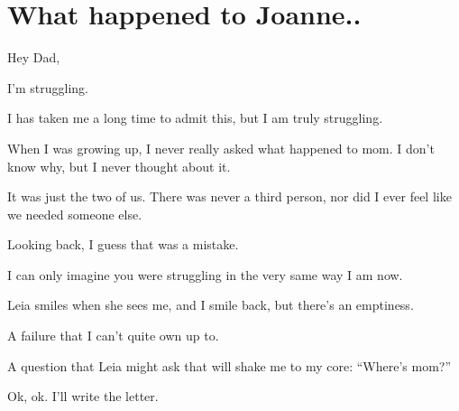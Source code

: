 \chapter{What happened to Joanne..}

\noindent Hey Dad,

I'm struggling.

I has taken me a long time to admit this, but I am truly struggling.

When I was growing up, I never really asked what happened to mom.
I don't know why, but I never thought about it.

It was just the two of us.
There was never a third person, nor did I ever feel like we needed someone else.

Looking back, I guess that was a mistake.

I can only imagine you were struggling in the very same way I am now.

Leia smiles when she sees me, and I smile back, but there's an emptiness.

A failure that I can't quite own up to.

A question that Leia might ask that will shake me to my core: ``Where's mom?''

Ok, ok. I'll write the letter.

